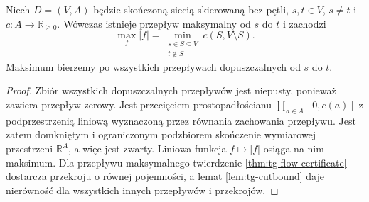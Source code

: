 \begin{wniosek}
\label{cor:tg-flow-real-mincut}
Niech $D=(V,A)$ będzie skończoną siecią skierowaną
bez pętli, $s,t\in V$, $s\ne t$ i
$c:A\to\mathbb R_{\geq0}$. Wówczas istnieje
przepływ maksymalny od $s$ do $t$ i zachodzi
\[
\max_f |f|=\min_{\substack{s\in S\subseteq V\\t\notin S}}
c(S,V\setminus S).
\]
Maksimum bierzemy po wszystkich przepływach
dopuszczalnych od $s$ do $t$.
\end{wniosek}
\begin{proof}
Zbiór wszystkich dopuszczalnych przepływów
jest niepusty, ponieważ zawiera przepływ zerowy.
Jest przecięciem prostopadłościanu
$\prod_{a\in A}[0,c(a)]$ z podprzestrzenią
liniową wyznaczoną przez równania zachowania przepływu.
Jest zatem domkniętym i ograniczonym podzbiorem
skończenie wymiarowej przestrzeni $\mathbb R^A$,
a więc jest zwarty.
Liniowa funkcja $f\mapsto |f|$ osiąga na nim
maksimum. Dla przepływu maksymalnego
twierdzenie \ref{thm:tg-flow-certificate}
dostarcza przekroju o równej pojemności,
a lemat \ref{lem:tg-cutbound} daje nierówność
dla wszystkich innych przepływów i przekrojów.
\end{proof}

